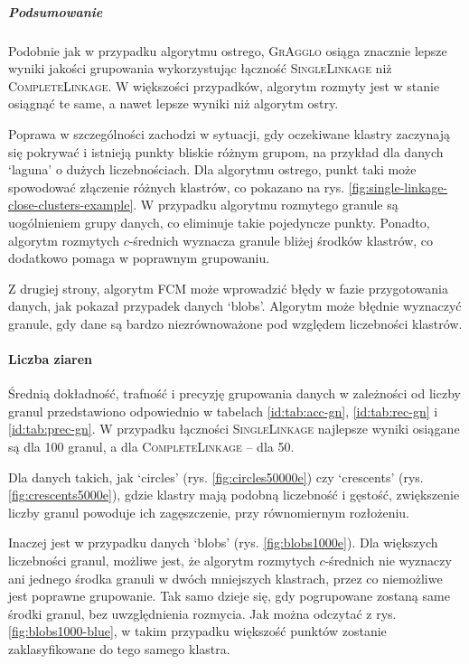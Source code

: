 \documentclass[a4paper,twoside,12pt]{book}
\newcommand{\dataset}[1]{`#1'}
\newcommand{\blobs}{\dataset{blobs}}
\newcommand{\circles}{\dataset{circles}}
\newcommand{\crescents}{\dataset{crescents}}
\newcommand{\laguna}{\dataset{laguna}}
\newcommand{\procedura}[1]{\textsc{#1}}
\newcommand{\SingleLinkage}{\procedura{Si\-ng\-le\-Lin\-ka\-ge}}
\newcommand{\CompleteLinkage}{\procedura{Com\-ple\-te\-Lin\-ka\-ge}}
\newcommand{\MojAlg}{\procedura{GrAgglo}}
\begin{document}
\subparagraph{Podsumowanie}

Podobnie jak w przypadku algorytmu ostrego, \MojAlg{} osiąga znacznie lepsze wyniki jakości grupowania wykorzystując łączność \SingleLinkage{} niż \CompleteLinkage{}. W większości przypadków, algorytm rozmyty jest w stanie osiągnąć te same, a nawet lepsze wyniki niż algorytm ostry. 

Poprawa w szczególności zachodzi w sytuacji, gdy oczekiwane klastry zaczynają się pokrywać i istnieją punkty bliskie różnym grupom, na przykład dla danych \laguna{} o dużych liczebnościach. Dla algorytmu ostrego, punkt taki może spowodować złączenie różnych klastrów, co pokazano na rys. \ref{fig:single-linkage-close-clusters-example}. W przypadku algorytmu rozmytego granule są uogólnieniem grupy danych, co eliminuje takie pojedyncze punkty. Ponadto, algorytm rozmytych $c$-średnich wyznacza granule bliżej środków klastrów, co dodatkowo pomaga w poprawnym grupowaniu.

Z drugiej strony, algorytm FCM może wprowadzić błędy w fazie przygotowania danych, jak pokazał przypadek danych \blobs{}. Algorytm może błędnie wyznaczyć granule, gdy dane są bardzo niezrównoważone pod względem liczebności klastrów.

\paragraph{Liczba ziaren}

Średnią dokładność, trafność i precyzję grupowania danych w zależności od liczby granul przedstawiono odpowiednio w tabelach \ref{id:tab:acc-gn}, \ref{id:tab:rec-gn} i \ref{id:tab:prec-gn}. W przypadku łączności \SingleLinkage{} najlepsze wyniki osiągane są dla 100 granul, a dla \CompleteLinkage{} -- dla 50.

Dla danych takich, jak \circles{} (rys. \ref{fig:circles50000e}) czy \crescents{} (rys. \ref{fig:crescents5000e}), gdzie klastry mają podobną liczebność i gęstość, zwiększenie liczby granul powoduje ich zagęszczenie, przy równomiernym rozłożeniu.

Inaczej jest w przypadku danych \blobs{} (rys. \ref{fig:blobs1000e}). Dla większych liczebności granul, możliwe jest, że algorytm rozmytych $c$-średnich nie wyznaczy ani jednego środka granuli w dwóch mniejszych klastrach, przez co niemożliwe jest poprawne grupowanie. Tak samo dzieje się, gdy pogrupowane zostaną same środki granul, bez uwzględnienia rozmycia. Jak można odczytać z rys. \ref{fig:blobs1000-blue}, w takim przypadku większość punktów zostanie zaklasyfikowane do tego samego klastra. 
\end{document}
